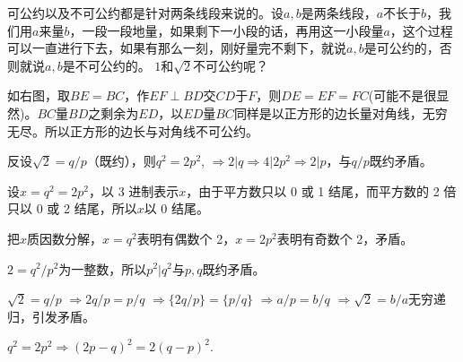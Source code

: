 \documentclass{article}
\theoremstyle{nonumberplain}\theorembodyfont{\normalfont}\theoremsymbol{$\Box$}
\begin{document}
可公约以及不可公约都是针对两条线段来说的。设$a,b$是两条线段，$a$不长于$b$，我们用$a$来量$b$，一段一段地量，如果剩下一小段的话，再用这一小段量$a$，这个过程可以一直进行下去，如果有那么一刻，刚好量完不剩下，就说$a,b$是可公约的，否则就说$a,b$是不可公约的。
$1$和$\sqrt2$不可公约呢？
\par
\begin{minipage}{\textwidth}\begin{minipage}{0.6\textwidth}
如右图，取$BE=BC$，作$EF\perp BD$交$CD$于$F$，则$DE=EF=FC$(可能不是很显然)。$BC$量$BD$之剩余为$ED$，以$ED$量$BC$同样是以正方形的边长量对角线，无穷无尽。所以正方形的边长与对角线不可公约。
\end{minipage}\quad\begin{minipage}{0.4\textwidth}
\end{minipage}\end{minipage}

\newcommand\proof[1]{\par\vspace*{1em}{\large\bf#1}\par}
\proof{证明$\mathbf{\sqrt2}$是无理数之整除}
反设$\sqrt2=q/p$（既约），则$q^2=2p^2$, $\Rightarrow 2|q \Rightarrow 4|2p^2 \Rightarrow 2|p$，与$q/p$既约矛盾。

\proof{3 进制表示}
设$x=q^2=2p^2$，以 3 进制表示$x$，由于平方数只以 0 或 1 结尾，而平方数的 2 倍只以 0 或 2 结尾，所以$x$以 0 结尾。

\proof{算术基本定理}
把$x$质因数分解，$x=q^2$表明有偶数个 2，$x=2p^2$表明有奇数个 2，矛盾。

\proof{平方为整数}
$2=q^2/p^2$为一整数，所以$p^2|q^2$与$p,q$既约矛盾。

\proof{取出小数部分}
$\sqrt2=q/p$ $\Rightarrow 2q/p=p/q$ $\Rightarrow \{2q/p\}=\{p/q\}$ $\Rightarrow a/p=b/q$ $\Rightarrow \sqrt2=b/a$无穷递归，引发矛盾。

\proof{又一个无穷递归}
$q^2=2p^2 \Rightarrow (2p-q)^2=2(q-p)^2$.
\end{document}
